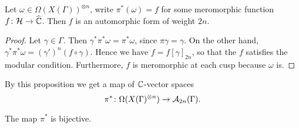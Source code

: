 \begin{prop}

 Let $\omega\in\Omega(X(\Gamma))^{\otimes n}$, write $\pi^*(\omega)=f$ for some meromorphic function $f\colon \mathcal{H}\to\widehat{\mathbb{C}}$. Then $f$ is an automorphic form of weight $2n$.
\end{prop}

\begin{proof}
 Let $\gamma\in\Gamma$. Then $\gamma^* \pi^* \omega = \pi^* \omega$, since $\pi \gamma = \gamma$. On the other hand, $\gamma^* \pi^* \omega = (\gamma')^n(f\circ\gamma)$. Hence we have $f=f[\gamma]_{2n}$, so that the $f$ satisfies the modular condition. Furthermore, $f$ is meromorphic at each cusp because $\omega$ is.
\end{proof}

By this proposition we get a map of $\mathbb{C}$-vector spaces \[\pi^*\colon\Omega(X(\Gamma)^{\otimes n})\to\mathcal{A}_{2n}(\Gamma).\]

\begin{prop}
 The map $\pi^*$ is bijective.
\end{prop}

